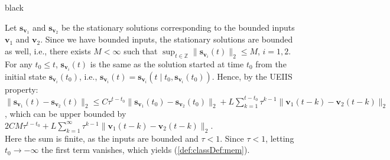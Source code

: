 \documentclass{ifacconf}
\def\eqref#1{(\ref{#1})}
\def\vs{{\bm{s}}}
\def\vv{{\bm{v}}}
\def\sZ{{\mathbb{Z}}}
\begin{document}
\begin{color}{black}
\begin{pf}
Let $\vs_{\vv_1}$ and $\vs_{\vv_2}$ be the stationary solutions corresponding to the bounded inputs $\vv_1$ and $\vv_2$. Since we have bounded inputs, the stationary solutions are bounded as well, i.e., there exists $M<\infty$ such that $\sup_{t\in\sZ}\|\vs_{\vv_i}(t)\|_2 \le M$, $i=1,2$.
For any $t_0 \le t$, $\vs_{\vv_i}(t)$ is the same as the solution started at time $t_0$ from the initial state $\vs_{\vv_i}(t_0)$, i.e., $\vs_{\vv_i}(t) = \vs_{\vv_i}(t \mid t_0, \vs_{\vv_i}(t_0))$.
Hence, by the UEIIS property: $\|\vs_{\vv_1}(t)-\vs_{\vv_2}(t)\|_2 \le C\tau^{t-t_0}\|\vs_{\vv_1}(t_0)-\vs_{\vv_2}(t_0)\|_2 + L\sum_{k=1}^{t-t_0}\tau^{k-1}\|\vv_1(t-k)-\vv_2(t-k)\|_2$, which can be upper bounded by $2CM\tau^{t-t_0} + L\sum_{k=1}^{\infty}\tau^{k-1}\|\vv_1(t-k)-\vv_2(t-k)\|_2$.\\
Here the sum is finite, as the inputs are bounded and $\tau<1$. Since $\tau<1$, letting $t_0\to-\infty$ the first term vanishes, which yields \eqref{def:classDef:mem}.
\end{pf}


\end{color}
\end{document}
